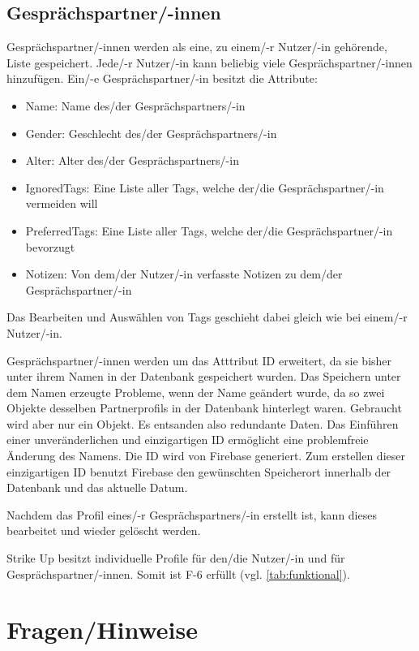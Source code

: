 \subsection{Gesprächspartner/-innen}
\label{subsec:gespraechspartner}

Gesprächspartner/-innen werden als eine, zu einem/-r Nutzer/-in gehörende, Liste gespeichert. Jede/-r Nutzer/-in kann beliebig viele Gesprächspartner/-innen hinzufügen. \newline
Ein/-e Gesprächspartner/-in besitzt die Attribute:
\begin{itemize}
    \item Name: Name des/der Gesprächspartners/-in
    \item Gender: Geschlecht des/der Gesprächspartners/-in
    \item Alter: Alter des/der Gesprächspartners/-in
    \item IgnoredTags: Eine Liste aller Tags, welche der/die Gesprächspartner/-in vermeiden will
    \item PreferredTags: Eine Liste aller Tags, welche der/die Gesprächspartner/-in bevorzugt
    \item Notizen: Von dem/der Nutzer/-in verfasste Notizen zu dem/der Gesprächspartner/-in
\end{itemize}
Das Bearbeiten und Auswählen von Tags geschieht dabei gleich wie bei einem/-r Nutzer/-in.

Gesprächspartner/-innen werden um das Atttribut ID erweitert, da sie bisher unter ihrem Namen in der Datenbank gespeichert wurden. Das Speichern unter dem Namen erzeugte Probleme, wenn
der Name geändert wurde, da so zwei Objekte desselben Partnerprofils in der Datenbank hinterlegt waren. Gebraucht wird aber nur ein Objekt. Es entsanden also redundante Daten. \newline
Das Einführen einer unveränderlichen und einzigartigen ID ermöglicht eine problemfreie Änderung des Namens. \newline
Die ID wird von Firebase generiert. Zum erstellen dieser einzigartigen ID benutzt Firebase den gewünschten Speicherort innerhalb der Datenbank und das aktuelle Datum.

Nachdem das Profil eines/-r Gesprächspartners/-in erstellt ist, kann dieses bearbeitet und wieder gelöscht werden.

Strike Up besitzt individuelle Profile für den/die Nutzer/-in und für Gesprächspartner/-innen. Somit ist F-6 erfüllt (vgl. \ref{tab:funktional}).


\section{Fragen/Hinweise}
\label{sec:fragen_hinweise}

